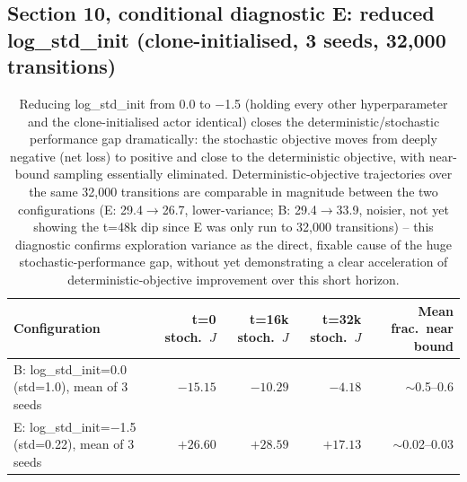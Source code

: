 \subsection*{Section 10, conditional diagnostic E: reduced log\_std\_init (clone-initialised, 3 seeds, 32,000 transitions)}
\begin{table}[h]
\centering
\begin{tabular}{lrrrr}
\hline
Configuration & t=0 stoch.\ $J$ & t=16k stoch.\ $J$ & t=32k stoch.\ $J$ & Mean frac.\ near bound \\
\hline
B: log\_std\_init=0.0 (std=1.0), mean of 3 seeds & $-15.15$ & $-10.29$ & $-4.18$ & $\sim$0.5--0.6 \\
E: log\_std\_init=$-$1.5 (std=0.22), mean of 3 seeds & $+26.60$ & $+28.59$ & $+17.13$ & $\sim$0.02--0.03 \\
\hline
\end{tabular}
\caption{Reducing log\_std\_init from 0.0 to $-$1.5 (holding every other
hyperparameter and the clone-initialised actor identical) closes the
deterministic/stochastic performance gap dramatically: the stochastic
objective moves from deeply negative (net loss) to positive and close to
the deterministic objective, with near-bound sampling essentially
eliminated. Deterministic-objective trajectories over the same 32,000
transitions are comparable in magnitude between the two configurations
(E: 29.4$\to$26.7, lower-variance; B: 29.4$\to$33.9, noisier, not yet
showing the t=48k dip since E was only run to 32,000 transitions) --
this diagnostic confirms exploration variance as the direct, fixable cause
of the huge stochastic-performance gap, without yet demonstrating a clear
acceleration of deterministic-objective improvement over this short horizon.}
\end{table}
